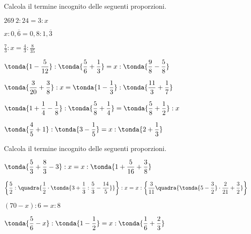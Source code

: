\begin{esercizio}
\label{ese:3.120}
Calcola il termine incognito delle seguenti proporzioni.
\begin{enumeratees}
\spazielenx
\item \(269~2:24 =3: x\)
\item \(x:0,\overline{6} =0,8:1,\overline{3}\)
\item \(\displaystyle{\frac{7}{3}:x=\frac{4}{3}:\frac{8}{35}}\)
\item \(\displaystyle{\tonda{1-\frac{5}{12}}:\tonda{\frac{5}{6}+
\frac{1}{3}}=x:\tonda{\frac{9}{8}-\frac{5}{8}}}\)
% 
\item \(\displaystyle{\tonda{\frac{3}{20}+\frac{3}{8}}:x=\tonda{1-
\frac{1}{3}}:%
\tonda{\frac{11}{3}+\frac{1}{7}}}\)
\item \(\displaystyle{\tonda{1+\frac{1}{4}-\frac{1}{8}}:
\tonda{\frac{5}{8}+\frac{1}{4}}=\tonda{\frac{5}{8}%
+\frac{1}{2}}:x}\)
\item \(\displaystyle{\tonda{\frac{4}{5}+1}:\tonda{3-\frac{1}{5}}=x:
\tonda{2+\frac{1}{3}}}\)
\end{enumeratees}
\end{esercizio}

\begin{esercizio}[*]
\label{ese:3.122}
Calcola il termine incognito delle seguenti proporzioni.
\begin{enumeratees}
\spazielenx
\item \(\displaystyle{\tonda{\frac{5}{3}+\frac{8}{3}-3}:x = x:\tonda{1 + 
\frac{5}{16}+\frac{3}{8}}}\)
\item \(\displaystyle{\bigg\lbrace\frac{5}{2}:\quadra{\frac{1}{2}\cdot
\tonda{3+\frac{1}{3}:\frac{5}{3}-\frac{14}{5}}}\bigg\rbrace%
:x=x:\bigg\lbrace\frac{3}{11}\quadra{\tonda{5-\frac{3}{2}}\cdot
\frac{2}{21}+\frac{3}{2}}\bigg\rbrace}\)
\item \((70-x):6=x:8\)
\item \(\displaystyle{\tonda{\frac{5}{6}-x}:\tonda{1- \frac{1}{2}}=
x: \tonda{\frac{1}{6}+ \frac{2}{3}}}\)
\end{enumeratees}
\end{esercizio}


